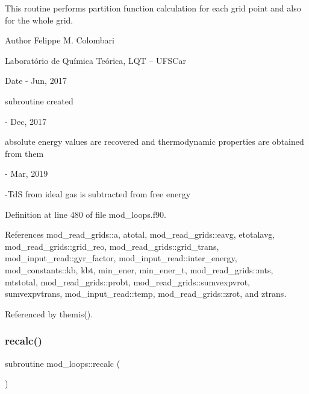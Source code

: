 This routine performs partition function calculation for each grid point and also for the whole grid. 

\begin{DoxyAuthor}{Author}
Felippe M. Colombari
\begin{DoxyItemize}
\item Laboratório de Química Teórica, L\+QT -- U\+F\+S\+Car 
\end{DoxyItemize}
\end{DoxyAuthor}
\begin{DoxyDate}{Date}
-\/ Jun, 2017
\begin{DoxyItemize}
\item subroutine created 
\end{DoxyItemize}

-\/ Dec, 2017
\begin{DoxyItemize}
\item absolute energy values are recovered and thermodynamic properties are obtained from them 
\end{DoxyItemize}

-\/ Mar, 2019
\begin{DoxyItemize}
\item -\/\+TdS from ideal gas is subtracted from free energy 
\end{DoxyItemize}
\end{DoxyDate}


Definition at line 480 of file mod\+\_\+loops.\+f90.



References mod\+\_\+read\+\_\+grids\+::a, atotal, mod\+\_\+read\+\_\+grids\+::eavg, etotalavg, mod\+\_\+read\+\_\+grids\+::grid\+\_\+reo, mod\+\_\+read\+\_\+grids\+::grid\+\_\+trans, mod\+\_\+input\+\_\+read\+::gyr\+\_\+factor, mod\+\_\+input\+\_\+read\+::inter\+\_\+energy, mod\+\_\+constants\+::kb, kbt, min\+\_\+ener, min\+\_\+ener\+\_\+t, mod\+\_\+read\+\_\+grids\+::mts, mtstotal, mod\+\_\+read\+\_\+grids\+::probt, mod\+\_\+read\+\_\+grids\+::sumvexpvrot, sumvexpvtrans, mod\+\_\+input\+\_\+read\+::temp, mod\+\_\+read\+\_\+grids\+::zrot, and ztrans.



Referenced by themis().

\mbox{\label{namespacemod__loops_a755c1c6e9232a99181d4ac9a7c0c5cff}} 
\subsubsection{\texorpdfstring{recalc()}{recalc()}}
{\footnotesize\ttfamily subroutine mod\+\_\+loops\+::recalc (\begin{DoxyParamCaption}{ }\end{DoxyParamCaption})}



